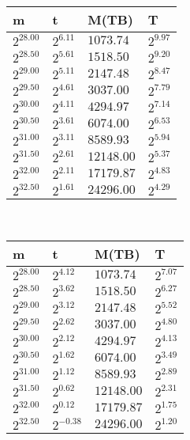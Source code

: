 \begin{tabular}{llll}
m & t & M(TB) & T \\ \hline
$2^{28.00}$ & $2^{6.11}$ & $1073.74$ & $2^{9.97}$ \\
$2^{28.50}$ & $2^{5.61}$ & $1518.50$ & $2^{9.20}$ \\
$2^{29.00}$ & $2^{5.11}$ & $2147.48$ & $2^{8.47}$ \\
$2^{29.50}$ & $2^{4.61}$ & $3037.00$ & $2^{7.79}$ \\
$2^{30.00}$ & $2^{4.11}$ & $4294.97$ & $2^{7.14}$ \\
$2^{30.50}$ & $2^{3.61}$ & $6074.00$ & $2^{6.53}$ \\
$2^{31.00}$ & $2^{3.11}$ & $8589.93$ & $2^{5.94}$ \\
$2^{31.50}$ & $2^{2.61}$ & $12148.00$ & $2^{5.37}$ \\
$2^{32.00}$ & $2^{2.11}$ & $17179.87$ & $2^{4.83}$ \\
$2^{32.50}$ & $2^{1.61}$ & $24296.00$ & $2^{4.29}$ \\
\end{tabular}
 \ 
\begin{tabular}{llll}
m & t & M(TB) & T \\ \hline
$2^{28.00}$ & $2^{4.12}$ & $1073.74$ & $2^{7.07}$ \\
$2^{28.50}$ & $2^{3.62}$ & $1518.50$ & $2^{6.27}$ \\
$2^{29.00}$ & $2^{3.12}$ & $2147.48$ & $2^{5.52}$ \\
$2^{29.50}$ & $2^{2.62}$ & $3037.00$ & $2^{4.80}$ \\
$2^{30.00}$ & $2^{2.12}$ & $4294.97$ & $2^{4.13}$ \\
$2^{30.50}$ & $2^{1.62}$ & $6074.00$ & $2^{3.49}$ \\
$2^{31.00}$ & $2^{1.12}$ & $8589.93$ & $2^{2.89}$ \\
$2^{31.50}$ & $2^{0.62}$ & $12148.00$ & $2^{2.31}$ \\
$2^{32.00}$ & $2^{0.12}$ & $17179.87$ & $2^{1.75}$ \\
$2^{32.50}$ & $2^{-0.38}$ & $24296.00$ & $2^{1.20}$ \\
\end{tabular}
 \ 
